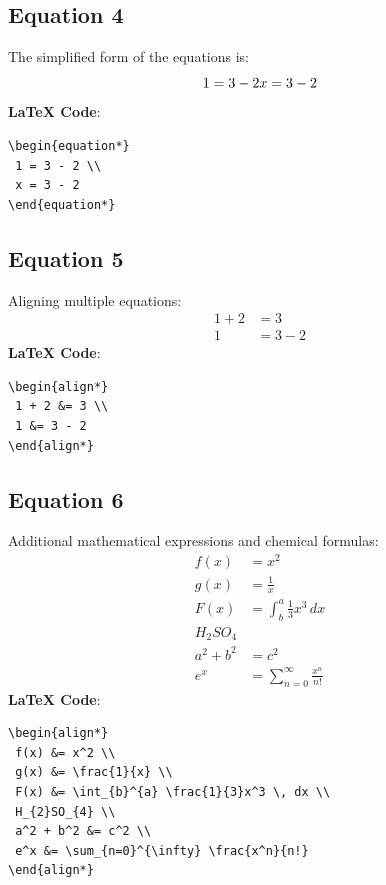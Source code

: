 \documentclass[12pt,a4paper]{article}
\begin{document}
\subsection{Equation 4}
The simplified form of the equations is:
\begin{equation*}
 1 = 3 - 2 \\
 x = 3 - 2
\end{equation*}
\textbf{LaTeX Code}:
\begin{verbatim}
\begin{equation*}
 1 = 3 - 2 \\
 x = 3 - 2
\end{equation*}
\end{verbatim}

\subsection{Equation 5}
Aligning multiple equations:
\begin{align*}
 1 + 2 &= 3 \\
 1 &= 3 - 2
\end{align*}
\textbf{LaTeX Code}: 
\begin{verbatim}
\begin{align*}
 1 + 2 &= 3 \\
 1 &= 3 - 2
\end{align*}
\end{verbatim}

\subsection{Equation 6}
Additional mathematical expressions and chemical formulas:
\begin{align*}
 f(x) &= x^2 \\                %
 g(x) &= \frac{1}{x} \\        %
 F(x) &= \int_{b}^{a} \frac{1}{3}x^3 \, dx \\  %
 H_{2}SO_{4} \\                %
 a^2 + b^2 &= c^2 \\           %
 e^x &= \sum_{n=0}^{\infty} \frac{x^n}{n!}  %
\end{align*}
\textbf{LaTeX Code}: 
\begin{verbatim}
\begin{align*}
 f(x) &= x^2 \\
 g(x) &= \frac{1}{x} \\
 F(x) &= \int_{b}^{a} \frac{1}{3}x^3 \, dx \\
 H_{2}SO_{4} \\
 a^2 + b^2 &= c^2 \\
 e^x &= \sum_{n=0}^{\infty} \frac{x^n}{n!}
\end{align*}
\end{verbatim}

    
\end{document}
